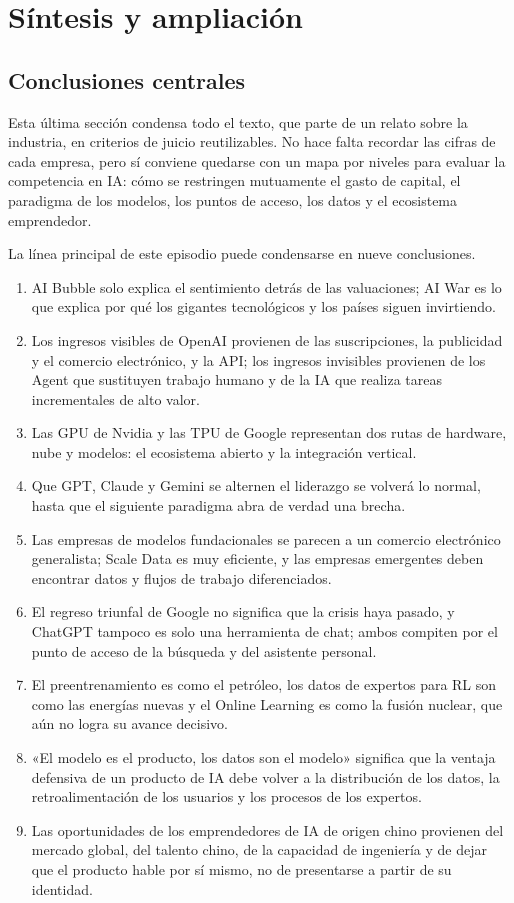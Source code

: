 \section{Síntesis y ampliación}

\subsection{Conclusiones centrales}

Esta última sección condensa todo el texto, que parte de un relato sobre la industria, en criterios de juicio reutilizables. No hace falta recordar las cifras de cada empresa, pero sí conviene quedarse con un mapa por niveles para evaluar la competencia en IA: cómo se restringen mutuamente el gasto de capital, el paradigma de los modelos, los puntos de acceso, los datos y el ecosistema emprendedor.

La línea principal de este episodio puede condensarse en nueve conclusiones.

\begin{enumerate}
\item AI Bubble solo explica el sentimiento detrás de las valuaciones; AI War es lo que explica por qué los gigantes tecnológicos y los países siguen invirtiendo.
\item Los ingresos visibles de OpenAI provienen de las suscripciones, la publicidad y el comercio electrónico, y la API; los ingresos invisibles provienen de los Agent que sustituyen trabajo humano y de la IA que realiza tareas incrementales de alto valor.
\item Las GPU de Nvidia y las TPU de Google representan dos rutas de hardware, nube y modelos: el ecosistema abierto y la integración vertical.
\item Que GPT, Claude y Gemini se alternen el liderazgo se volverá lo normal, hasta que el siguiente paradigma abra de verdad una brecha.
\item Las empresas de modelos fundacionales se parecen a un comercio electrónico generalista; Scale Data es muy eficiente, y las empresas emergentes deben encontrar datos y flujos de trabajo diferenciados.
\item El regreso triunfal de Google no significa que la crisis haya pasado, y ChatGPT tampoco es solo una herramienta de chat; ambos compiten por el punto de acceso de la búsqueda y del asistente personal.
\item El preentrenamiento es como el petróleo, los datos de expertos para RL son como las energías nuevas y el Online Learning es como la fusión nuclear, que aún no logra su avance decisivo.
\item «El modelo es el producto, los datos son el modelo» significa que la ventaja defensiva de un producto de IA debe volver a la distribución de los datos, la retroalimentación de los usuarios y los procesos de los expertos.
\item Las oportunidades de los emprendedores de IA de origen chino provienen del mercado global, del talento chino, de la capacidad de ingeniería y de dejar que el producto hable por sí mismo, no de presentarse a partir de su identidad.
\end{enumerate}

